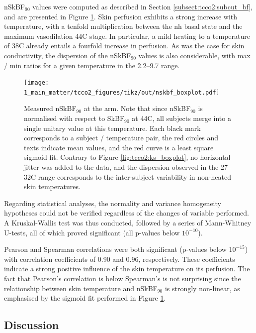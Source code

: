 nSkBF$_{90}$ values were computed as described in Section \ref{subsect:tcco2:subcut_bf}, and are presented in Figure \ref{fig:tcco2:nskbf_boxplot}. Skin perfusion exhibits a strong increase with temperature, with a tenfold multiplication between the \gls{nh} basal state and the maximum vasodilation 44{\degree}C stage. In particular, a mild heating to a temperature of 38{\degree}C already entails a fourfold increase in perfusion. As was the case for skin conductivity, the dispersion of the nSkBF$_{90}$ values is also considerable, with max / min ratios for a given temperature in the 2.2--9.7 range.

\begin{figure}
	\centering
	\texttt{[image: 1\_main\_matter/tcco2\_figures/tikz/out/nskbf\_boxplot.pdf]}
	\caption[Measured nSkBF$_{90}$ at the arm.]{Measured nSkBF$_{90}$ at the arm. Note that since nSkBF$_{90}$ is normalised with respect to SkBF$_{90}$ at 44{\degree}C, all subjects merge into a single unitary value at this temperature. Each black mark corresponds to a subject / temperature pair, the red circles and texts indicate mean values, and the red curve is a least square sigmoid fit. Contrary to Figure \ref{fig:tcco2:ks_boxplot}, no horizontal jitter was added to the data, and the dispersion observed in the 27--32{\degree}C range corresponds to the inter-subject variability in non-heated skin temperatures.}\label{fig:tcco2:nskbf_boxplot}
\end{figure}

Regarding statistical analyses, the normality and variance homogeneity hypotheses could not be verified regardless of the changes of variable performed. A Kruskal-Wallis test was thus conducted, followed by a series of Mann-Whitney U-tests, all of which proved significant (all p-values below $10^{-10}$).

Pearson and Spearman correlations were both significant (p-values below $10^{-15}$) with correlation coefficients of 0.90 and 0.96, respectively. These coefficients indicate a strong positive influence of the skin temperature on its perfusion. The fact that Pearson's correlation is below Spearman's is not surprising since the relationship between skin temperature and nSkBF$_{90}$ is strongly non-linear, as emphasised by the sigmoid fit performed in Figure \ref{fig:tcco2:nskbf_boxplot}.

\subsection{Discussion}\label{sect:discussion}

